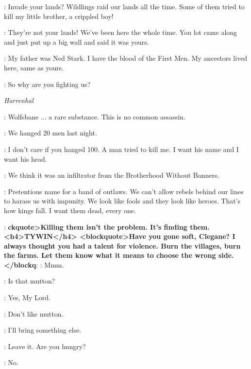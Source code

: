 \JON: Invade your lands? Wildlings raid our lands all the time. Some of them tried to kill my little brother, a crippled boy!

\YGRITTE: They're not your lands! We've been here the whole time. You lot came along and just put up a big wall and said it was yours.

\JON: My father was Ned Stark. I have the blood of the First Men. My ancestors lived here, same as yours.

\YGRITTE: So why are you fighting us?



\scene

\textit{Harrenhal}


\TYWIN: Wolfsbane $\ldots$ a rare substance. This is no common assassin.

\MOUNTAIN: We hanged 20 men last night.

\TYWIN: I don't care if you hanged 100. A man tried to kill me. I want his name and I want his head.


\MOUNTAIN: We think it was an infiltrator from the Brotherhood Without Banners.

\TYWIN: Pretentious name for a band of outlaws. We can't allow rebels behind our lines to harass us with impunity. We look like fools and they look like heroes. That's how kings fall. I want them dead, every one.

\MOUNTAIN: \textbf{ckquote>Killing them isn't the problem. It's finding them. <h4>TYWIN</h4> <blockquote>Have you gone soft, Clegane? I always thought you had a talent for violence. Burn the villages, burn the farms. Let them know what it means to choose the wrong side.</blockq}: \MOUNTAIN: Mmm.


\TYWIN: Is that mutton?

\ARYA: Yes, My Lord.

\TYWIN: Don't like mutton.

\ARYA: I'll bring something else.

\TYWIN: Leave it. Are you hungry?

\ARYA: No.

